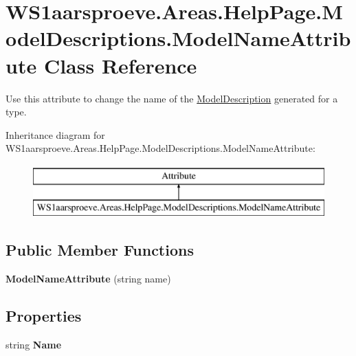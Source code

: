 \hypertarget{class_w_s1aarsproeve_1_1_areas_1_1_help_page_1_1_model_descriptions_1_1_model_name_attribute}{}\section{W\+S1aarsproeve.\+Areas.\+Help\+Page.\+Model\+Descriptions.\+Model\+Name\+Attribute Class Reference}
\label{class_w_s1aarsproeve_1_1_areas_1_1_help_page_1_1_model_descriptions_1_1_model_name_attribute}


Use this attribute to change the name of the \hyperlink{class_w_s1aarsproeve_1_1_areas_1_1_help_page_1_1_model_descriptions_1_1_model_description}{Model\+Description} generated for a type.  


Inheritance diagram for W\+S1aarsproeve.\+Areas.\+Help\+Page.\+Model\+Descriptions.\+Model\+Name\+Attribute\+:\begin{figure}[H]
\begin{center}
\leavevmode
\includegraphics[height=2.000000cm]{class_w_s1aarsproeve_1_1_areas_1_1_help_page_1_1_model_descriptions_1_1_model_name_attribute}
\end{center}
\end{figure}
\subsection*{Public Member Functions}
\begin{DoxyCompactItemize}
\item 
\hypertarget{class_w_s1aarsproeve_1_1_areas_1_1_help_page_1_1_model_descriptions_1_1_model_name_attribute_aa76500adc194ad2329e90c930fb4cdac}{}{\bfseries Model\+Name\+Attribute} (string name)\label{class_w_s1aarsproeve_1_1_areas_1_1_help_page_1_1_model_descriptions_1_1_model_name_attribute_aa76500adc194ad2329e90c930fb4cdac}

\end{DoxyCompactItemize}
\subsection*{Properties}
\begin{DoxyCompactItemize}
\item 
\hypertarget{class_w_s1aarsproeve_1_1_areas_1_1_help_page_1_1_model_descriptions_1_1_model_name_attribute_a376df24930887cfd1910566aaf72ae64}{}string {\bfseries Name}\label{class_w_s1aarsproeve_1_1_areas_1_1_help_page_1_1_model_descriptions_1_1_model_name_attribute_a376df24930887cfd1910566aaf72ae64}

\end{DoxyCompactItemize}


